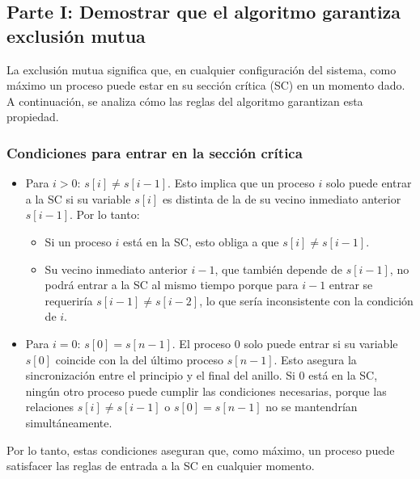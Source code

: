 \documentclass[a4paper,12pt]{article}
\begin{document}

\subsection{Parte I: Demostrar que el algoritmo garantiza exclusión mutua}

La exclusión mutua significa que, en cualquier configuración del sistema, como máximo un proceso puede estar en su sección crítica (SC) en un momento dado. A continuación, se analiza cómo las reglas del algoritmo garantizan esta propiedad.

\subsubsection{Condiciones para entrar en la sección crítica}

\begin{itemize}
    \item Para $i > 0$: $s[i] \neq s[i-1]$.  
    Esto implica que un proceso $i$ solo puede entrar a la SC si su variable $s[i]$ es distinta de la de su vecino inmediato anterior $s[i-1]$. Por lo tanto:
    \begin{itemize}
        \item Si un proceso $i$ está en la SC, esto obliga a que $s[i] \neq s[i-1]$.
        \item Su vecino inmediato anterior $i-1$, que también depende de $s[i-1]$, no podrá entrar a la SC al mismo tiempo porque para $i-1$ entrar se requeriría $s[i-1] \neq s[i-2]$, lo que sería inconsistente con la condición de $i$.
    \end{itemize}

    \item Para $i = 0$: $s[0] = s[n-1]$.  
    El proceso $0$ solo puede entrar si su variable $s[0]$ coincide con la del último proceso $s[n-1]$. Esto asegura la sincronización entre el principio y el final del anillo. Si $0$ está en la SC, ningún otro proceso puede cumplir las condiciones necesarias, porque las relaciones $s[i] \neq s[i-1]$ o $s[0] = s[n-1]$ no se mantendrían simultáneamente.
\end{itemize}

Por lo tanto, estas condiciones aseguran que, como máximo, un proceso puede satisfacer las reglas de entrada a la SC en cualquier momento.
\end{document}
